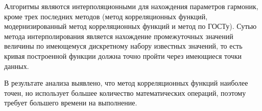 





Алгоритмы являются интерполяционными для нахождения параметров гармоник, кроме трех последних методов (метод корреляционных функций, модернизированный метод корреляционных функций и метод по ГОСТу). Сутью метода интерполирования является нахождение промежуточных значений величины по имеющемуся дискретному набору известных значений, то есть кривая построенной функции должна точно пройти через имеющиеся точки данных.

В результате анализа выявлено, что метод корреляционных функций
наиболее точен, но использует большее количество математических операций,
поэтому требует большего времени на выполнение.

